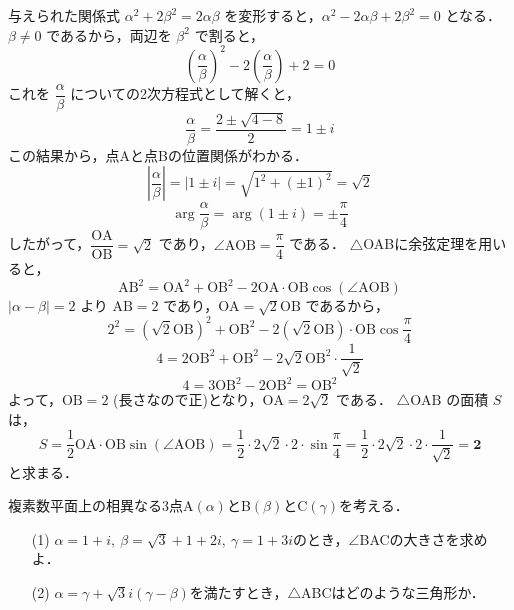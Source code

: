 \documentclass[a4paper,11pt]{ltjsarticle}
\begin{document}
\ans
与えられた関係式 $\alpha^2+2\beta^2=2\alpha\beta$ を変形すると，$\alpha^2-2\alpha\beta+2\beta^2=0$ となる．
$\beta\neq0$ であるから，両辺を $\beta^2$ で割ると，
\[\left(\frac{\alpha}{\beta}\right)^2-2\left(\frac{\alpha}{\beta}\right)+2=0\]
これを $\dfrac{\alpha}{\beta}$ についての2次方程式として解くと，
\[\frac{\alpha}{\beta}=\frac{2\pm\sqrt{4-8}}{2}=1\pm i\]
この結果から，点Aと点Bの位置関係がわかる．
\[\left|\frac{\alpha}{\beta}\right|=|1\pm i|=\sqrt{1^2+(\pm1)^2}=\sqrt2\]
\[\arg\frac{\alpha}{\beta}=\arg(1\pm i)=\pm\frac\pi4\]
したがって，$\dfrac{\mathrm{OA}}{\mathrm{OB}}=\sqrt2$ であり，$\angle\mathrm{AOB}=\dfrac\pi4$ である．
$\triangle$OABに余弦定理を用いると，
\[\mathrm{AB}^2=\mathrm{OA}^2+\mathrm{OB}^2-2\mathrm{OA}\cdot\mathrm{OB}\cos(\angle\mathrm{AOB})\]
$|\alpha-\beta|=2$ より $\mathrm{AB}=2$ であり，$\mathrm{OA}=\sqrt2\mathrm{OB}$ であるから，
\[2^2=(\sqrt2\mathrm{OB})^2+\mathrm{OB}^2-2(\sqrt2\mathrm{OB})\cdot\mathrm{OB}\cos\frac\pi4\]
\[4=2\mathrm{OB}^2+\mathrm{OB}^2-2\sqrt2\mathrm{OB}^2\cdot\frac{1}{\sqrt2}\]
\[4=3\mathrm{OB}^2-2\mathrm{OB}^2=\mathrm{OB}^2\]
よって，$\mathrm{OB}=2$ (長さなので正)となり，$\mathrm{OA}=2\sqrt2$ である．
$\triangle\mathrm{OAB}$ の面積 $S$ は，
\[S=\frac12\mathrm{OA}\cdot\mathrm{OB}\sin(\angle\mathrm{AOB})=\frac12\cdot2\sqrt2\cdot2\cdot\sin\frac\pi4=\frac12\cdot2\sqrt2\cdot2\cdot\frac{1}{\sqrt2}=\boldsymbol{2}\]
と求まる．
\newpage
\begin{toi}
複素数平面上の相異なる3点A$(\alpha)$とB$(\beta)$とC$(\gamma)$を考える．
\begin{itemize}
    \item [(1)]$\alpha=1+i,~\beta=\sqrt3+1+2i,~\gamma=1+3i$のとき，$\angle$BACの大きさを求めよ．
    \item[(2)]$\alpha=\gamma+\sqrt3i(\gamma-\beta)$を満たすとき，$\triangle$ABCはどのような三角形か．
\end{itemize}
\end{toi}
\ans
\end{document}
